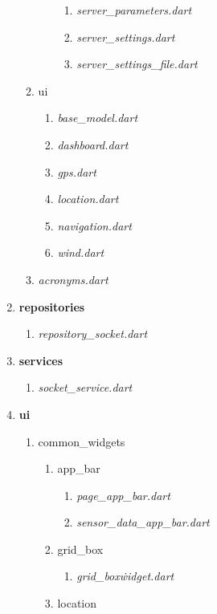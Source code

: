 \begin{enumerate}
\begin{enumerate}
\begin{enumerate}
\begin{enumerate}
							\item \textit{server\_parameters.dart}
							\item \textit{server\_settings.dart}
							\item \textit{server\_settings\_file.dart}
						\end{enumerate}
				\end{enumerate}
			\item ui
				\begin{enumerate}
					\item \textit{base\_model.dart}
					\item \textit{dashboard.dart}
					\item \textit{gps.dart}
					\item \textit{location.dart}
					\item \textit{navigation.dart}
					\item \textit{wind.dart}
				\end{enumerate}
			\item \textit{acronyms.dart}
		\end{enumerate}
	\item \textbf{repositories}
		\begin{enumerate}
			\item \textit{repository\_socket.dart}
		\end{enumerate}
	\item \textbf{services}
		\begin{enumerate}
			\item \textit{socket\_service.dart}
		\end{enumerate}
	\item \textbf{ui}
		\begin{enumerate}
			\item common\_widgets
				\begin{enumerate}
					\item app\_bar
						\begin{enumerate}
							\item \textit{page\_app\_bar.dart}
							\item \textit{sensor\_data\_app\_bar.dart}
						\end{enumerate}
					\item grid\_box
						\begin{enumerate}
							\item \textit{grid\_box\.widget.dart}
						\end{enumerate}
					\item location
						\begin{enumerate}

\end{enumerate}
\end{enumerate}
\end{enumerate}
\end{enumerate}
